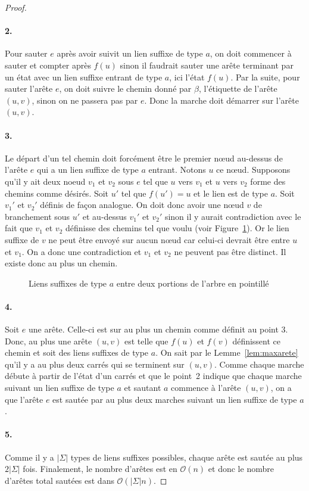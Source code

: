 \documentclass[10pt,letterpaper,oneside]{article}
\newcommand{\bigo}{\mathcal{O}}
\begin{document}
\begin{proof}
    \paragraph*{2.} Pour sauter $e$ après avoir suivit un lien suffixe de type $a$, on doit commencer à sauter et compter après $f(u)$ sinon il faudrait sauter une arête terminant par un état avec un lien suffixe entrant de type $a$, ici l'état $f(u)$. Par la suite, pour sauter l'arête $e$, on doit suivre le chemin donné par $\beta$, l'étiquette de l'arête $(u,v)$, sinon on ne passera pas par $e$. Donc la marche doit démarrer sur l'arête $(u,v)$.
    
    \paragraph*{3.} Le départ d'un tel chemin doit forcément être le premier nœud au-dessus de l'arête $e$ qui a un lien suffixe de type $a$ entrant. Notons $u$ ce nœud. Supposons qu'il y ait deux noeud $v_1$ et $v_2$ sous $e$ tel que $u$ vers $v_1$ et $u$ vers $v_2$ forme des chemins comme désirés. Soit $u'$ tel que $f(u')=u$  et le lien est de type $a$. Soit $v_1'$ et $v_2'$ définis de façon analogue. On doit donc avoir une  nœud $v$ de branchement sous $u'$ et au-dessus $v_1'$ et $v_2'$ sinon il y aurait contradiction avec le fait que $v_1$ et $v_2$ définisse des chemins tel que voulu (voir Figure~\ref{fig:liensuffixe}). Or le lien suffixe de $v$ ne peut être envoyé sur aucun nœud car celui-ci devrait être entre $u$ et $v_1$. On a donc une contradiction et $v_1$ et $v_2$ ne peuvent pas être distinct. Il existe donc au plus un chemin.
    \begin{figure}[htb]
        \centering
        
        \caption{Liens suffixes de type $a$ entre deux portions de l'arbre en pointillé} \label{fig:liensuffixe}
    \end{figure}
    
    \paragraph*{4.} Soit $e$ une arête. Celle-ci est sur au plus un chemin comme définit au point 3. Donc, au plus une arête $(u,v)$ est telle que $f(u)$ et $f(v)$ définissent ce chemin et soit des liens suffixes de type $a$. On sait par le Lemme~\ref{lem:maxarete} qu'il y a au plus deux carrés qui se terminent sur $(u,v)$. Comme chaque marche débute à partir de l'état d'un carrés et que le point~2 indique que chaque marche suivant un lien suffixe de type $a$ et sautant $a$ commence à l'arête $(u,v)$, on a que l'arête $e$ est sautée par au plus deux marches suivant un lien suffixe de type $a$.
    
    \paragraph*{5.} Comme il y a $|\Sigma|$ types de liens suffixes possibles, chaque arête est sautée au plus $2|\Sigma|$ fois. Finalement, le nombre d'arêtes est en $\bigo(n)$ et donc le nombre d'arêtes total sautées est dans $\bigo(|\Sigma| n)$.
\end{proof}
\end{document}
